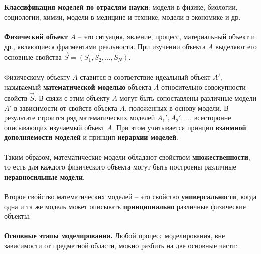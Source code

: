\documentclass[a4paper, 12pt]{report}
\numberwithin{equation}{section}
\begin{document}
	\\\\
	\textbf{Классификация моделей по отраслям науки}: модели в физике,
	биологии, социологии, химии, модели в медицине и технике, модели в
	экономике и др.
	\\\\
	\textbf{Физический объект $A$} -- это ситуация, явление, процесс, материальный объект и др., являющиеся фрагментами реальности. При изучении объекта $A$ выделяют его основные свойства $\vec{S} = (S_1, S_2, \ldots, S_N)$.  
	\\\\
	Физическому объекту $A$ ставится в соответствие идеальный объект $A'$, называемый \textbf{математической моделью} объекта $A$ относительно совокупности свойств $\vec{S}$. В связи с этим объекту $A$ могут быть сопоставлены различные модели $A'$ в зависимости от свойств объекта $A$, положенных в основу модели. В результате строится ряд математических моделей $A_1', A_2', \ldots$, всесторонне описывающих изучаемый объект $A$. При этом учитывается принцип \textbf{взаимной дополняемости моделей} и принцип \textbf{иерархии моделей}.  
	\\\\
	Таким образом, математические модели обладают свойством \textbf{множественности}, то есть для каждого физического объекта могут быть построены различные \textbf{неравносильные модели}.  
	\\\\
	Второе свойство математических моделей -- это свойство \textbf{универсальности}, когда одна и та же модель может описывать \textbf{принципиально} различные физические объекты.
	\\\\
	\textbf{Основные этапы моделирования.} Любой процесс моделирования, вне зависимости от предметной области, можно разбить на две основные части:
\end{document}
